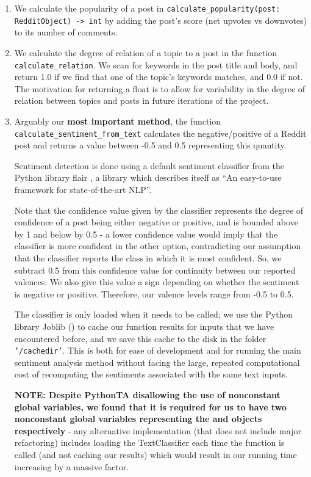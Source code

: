 \documentclass[fontsize=11pt]{article}
\begin{document}
\begin{enumerate}
    \item We calculate the popularity of a post in \texttt{calculate\_popularity(post: RedditObject) -> int} by adding the post's score (net upvotes vs downvotes) to its number of comments.
    \item We calculate the degree of relation of a topic to a post in the function \texttt{calculate\_relation}. We scan for keywords in the post title and body, and return 1.0 if we find that one of the topic's keywords matches, and 0.0 if not. The motivation for returning a float is to allow for variability in the degree of relation between topics and posts in future iterations of the project.
    \item Arguably our \textbf{most important method}, the function \texttt{calculate\_sentiment\_from\_text} calculates the negative/positive of a Reddit post and returns a value between -0.5 and 0.5 representing this quantity. 
    
    Sentiment detection is done using a default sentiment classifier from the Python library flair \cite{akbik2019flair}, a library which describes itself as ``An easy-to-use framework for state-of-the-art NLP''. 
    
    Note that the confidence value given by the classifier represents the degree of confidence of a post being either negative or positive, and is bounded above by 1 and below by 0.5 - a lower confidence value would imply that the classifier is more confident in the other option, contradicting our assumption that the classifier reports the class in which it is most confident. So, we subtract 0.5 from this confidence value for continuity between our reported valences. We also give this value a sign depending on whether the sentiment is negative or positive. Therefore, our valence levels range from -0.5 to 0.5.
    
    The classifier is only loaded when it needs to be called; we use the Python library Joblib (\cite{joblib}) to cache our function results for inputs that we have encountered before, and we save this cache to the disk in the folder \texttt{'/cachedir'}. This is both for ease of development and for running the main sentiment analysis method without facing the large, repeated computational cost of recomputing the sentiments associated with the same text inputs.
    
    \textbf{NOTE: Despite PythonTA disallowing the use of nonconstant global variables, we found that it is required for us to have two nonconstant global variables representing the  and  objects respectively} - any alternative implementation (that does not include major refactoring) includes loading the TextClassifier each time the function is called (and not caching our results) which would result in our running time increasing by a massive factor.
    

\end{enumerate}
\end{document}
